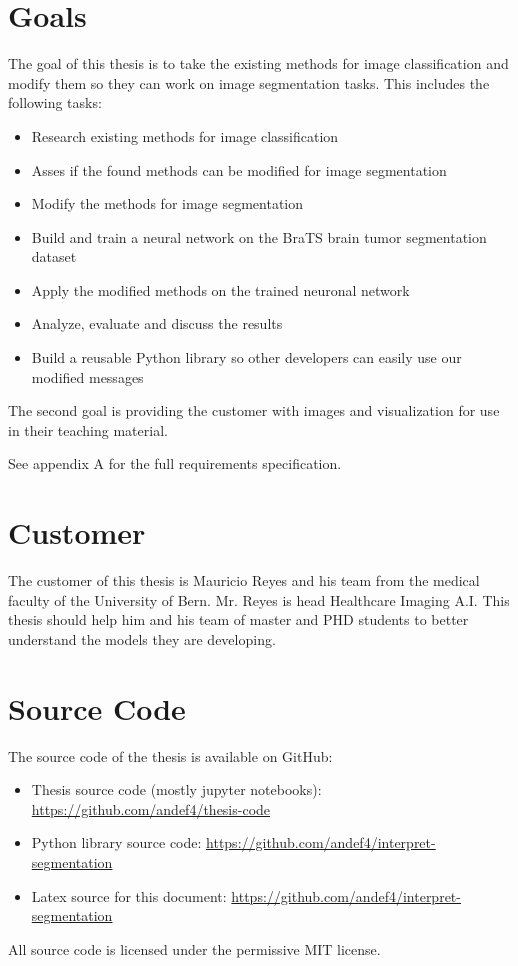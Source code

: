 \section{Goals}
The goal of this thesis is to take the existing methods for image classification and modify them so they can work on image segmentation tasks. This includes the following tasks:
\begin{itemize}
    \item Research existing methods for image classification
    \item Asses if the found methods can be modified for image segmentation
    \item Modify the methods for image segmentation
    \item Build and train a neural network on the BraTS brain tumor segmentation dataset
    \item Apply the modified methods on the trained neuronal network
    \item Analyze, evaluate and discuss the results
    \item Build a reusable Python library so other developers can easily use our modified messages
\end{itemize}

The second goal is providing the customer with images and visualization for use in their teaching material.

See appendix A for the full requirements specification.

\section{Customer}
The customer of this thesis is Mauricio Reyes and his team from the medical faculty of the University of Bern. Mr. Reyes is head Healthcare Imaging A.I. This thesis should help him and his team of master and PHD students to better understand the models they are developing.

\section{Source Code}
The source code of the thesis is available on GitHub:
\begin{itemize}
    \item Thesis source code (mostly jupyter notebooks): \url{https://github.com/andef4/thesis-code}
    \item Python library source code: \url{https://github.com/andef4/interpret-segmentation}
    \item Latex source for this document: \url{https://github.com/andef4/interpret-segmentation}
\end{itemize}

All source code is licensed under the permissive MIT license.
